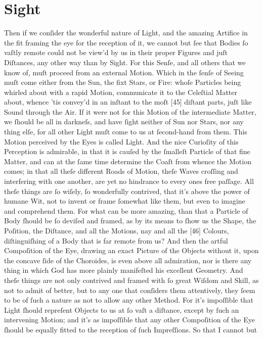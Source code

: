 \documentclass[letterpaper]{book}
\begin{document}
\section{Sight}

Then if we conſider the wonderful nature of Light, and the amazing Artifice
in the fit framing the eye for the reception of it, we cannot but ſee that
Bodies ſo vaſtly remote could not be view'd by us in their proper Figures
and juſt Diſtances, any other way than by Sight. For this Senſe, and all
others that we know of, muſt proceed from an external Motion. Which in the
ſenſe of Seeing muſt come either from the Sun, the fixt Stars, or Fire:
whoſe Particles being whirled about with a rapid Motion, communicate it to
the Celeſtial Matter about, whence 'tis convey'd in an inſtant to the moſt
[45] diſtant parts, juſt like Sound through the Air. If it were not for this
Motion of the intermediate Matter, we ſhould be all in darkneſs, and have
ſight neither of Sun nor Stars, nor any thing elſe, for all other Light muſt
come to us at ſecond-hand from them. This Motion perceived by the Eyes is
called Light. And the nice Curioſity of this Perception is admirable, in
that it is cauſed by the ſmalleſt Particle of that fine Matter, and can at
the ſame time determine the Coaſt from whence the Motion comes; in that all
theſe different Roads of Motion, theſe Waves croſſing and interfering with
one another, are yet no hindrance to every ones free paſſage. All theſe
things are ſo wiſely, ſo wonderfully contrived, that it's above the power of
humane Wit, not to invent or frame ſomewhat like them, but even to imagine
and comprehend them. For what can be more amazing, than that a Particle of
Body ſhould be ſo deviſed and framed, as by its means to ſhow us the Shape,
the Poſition, the Diſtance, and all the Motions, nay and all the [46]
Colours, diſtinguiſhing of a Body that is far remote from us? And then the
artful Compoſition of the Eye, drawing an exact Picture of the Objects
without it, upon the concave ſide of the Choroides, is even above all
admiration, nor is there any thing in which God has more plainly manifeſted
his excellent Geometry. And theſe things are not only contrived and framed
with ſo great Wiſdom and Skill, as not to admit of better, but to any one
that conſiders them attentively, they ſeem to be of ſuch a nature as not to
allow any other Method. For it's impoſſible that Light ſhould repreſent
Objects to us at ſo vaſt a diſtance, except by ſuch an intervening Motion;
and it's as impoſſible that any other Compoſition of the Eye ſhould be
equally fitted to the reception of ſuch Impreſſions. So that I cannot but
\end{document}
